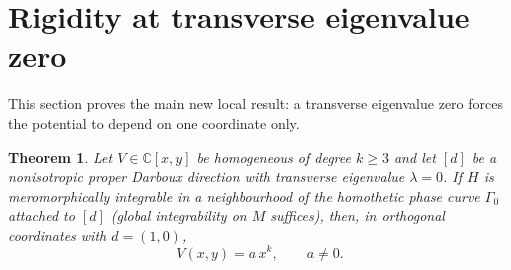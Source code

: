 \documentclass[11pt]{article}
\numberwithin{equation}{section}
\newtheorem{theorem}{Theorem}[section]
\theoremstyle{definition}
\theoremstyle{remark}
\newcommand{\C}{\mathbb C}
\begin{document}
\section{Rigidity at transverse eigenvalue zero}\label{sec:zero}

This section proves the main new local result: a transverse eigenvalue zero forces the potential to depend on one
coordinate only.

\begin{theorem}\label{thm:zero}
Let $V\in\C[x,y]$ be homogeneous of degree $k\ge3$ and let $[d]$ be a nonisotropic proper Darboux direction with
transverse eigenvalue $\lambda=0$. If $H$ is meromorphically integrable in a neighbourhood of the homothetic phase
curve $\Gamma_0$ attached to $[d]$ (global integrability on $M$ suffices), then, in orthogonal coordinates with
$d=(1,0)$,
\begin{equation}\label{eq:R1}
V(x,y)=a\,x^k,\qquad a\ne0 .
\end{equation}
\end{theorem}
\end{document}
